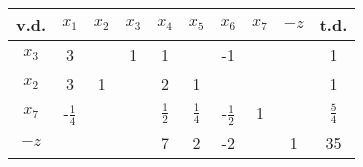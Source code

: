 \begin{center}
	\renewcommand{\arraystretch}{1.5}
	\begin{tabular}{|c|cccccccc|c|}
		\hline
		v.d.  &     $x_1$      & $x_2$ & $x_3$ &     $x_4$     &     $x_5$     &     $x_6$      & $x_7$ & $-z$ &     t.d.      \\ \hline
		$x_3$ &       3        &       &   1   &       1       &               &       -1       &       &      &       1       \\
		$x_2$ &       3        &   1   &       &       2       &       1       &                &       &      &       1       \\
		$x_7$ & -$\frac{1}{4}$ &       &       & $\frac{1}{2}$ & $\frac{1}{4}$ & -$\frac{1}{2}$ &   1   &      & $\frac{5}{4}$ \\ \hline
		$-z$  &                &       &       &       7       &       2       &       -2       &       &  1   &      35       \\ \hline
	\end{tabular}
\end{center}
